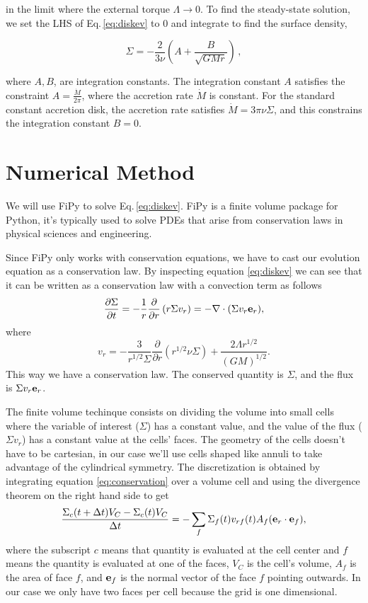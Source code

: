 \documentclass{article}
\begin{document}
in the limit where the external torque $\Lambda \rightarrow 0$. To find the steady-state solution, we set the LHS of Eq.\,\ref{eq:diskev} to 0 and integrate to find the surface density,

\begin{equation}
\Sigma = -\frac{2}{3 \nu} \left(A+  \frac{B}{\sqrt{G M r}}\right)\,,
\end{equation}

where $A, B$, are integration constants. The integration constant $A$ satisfies the constraint $A = \frac{\dot{M}}{2\pi}$, where the accretion rate $\dot{M}$ is constant. For the standard constant accretion disk, the accretion rate satisfies $\dot{M} = 3\pi \nu \Sigma$, and this constrains the integration constant $B = 0$.

\section{Numerical Method}

We will use FiPy to solve Eq.\,\ref{eq:diskev}. FiPy is a finite volume package for Python, it's typically used to
solve PDEs that arise from conservation laws in physical sciences and engineering.

Since FiPy only works with conservation equations, we have to cast our evolution equation as a conservation law.
By inspecting equation \ref{eq:diskev} we can see that it can be written as a conservation law with a convection 
term as follows
\begin{equation} \label{eq:conservation}
\frac{\partial \Sigma}{\partial t} = -\frac{1}{r} \frac{\partial}{\partial r} \left( r \Sigma v_{r}\right)=-\nabla\cdot (\Sigma v_r \bold{e}_{r}),
\end{equation}
where
\begin{equation} \label{eq:vr}
v_r = -\frac{3}{r^{1/2}\Sigma} \frac{\partial}{\partial r} \left(r^{1/2} \nu \Sigma\right) + \frac{2 \Lambda r^{1/2}}{(G M)^{1/2}}.
\end{equation}
This way we have a conservation law. The conserved quantity is $\Sigma$, and the flux is $\Sigma v_r \bold{e}_r$.

The finite volume techinque consists on dividing the volume into small cells where the variable of interest ($\Sigma$) has a constant value,
and the value of the flux ($\Sigma v_r$) has a constant value at the cells' faces. The geometry of the cells doesn't have to be cartesian, in
our case we'll use cells shaped like annuli to take advantage of the cylindrical symmetry.
The discretization is obtained by integrating equation \ref{eq:conservation} over a volume cell and using the divergence theorem on the
right hand side to get
\begin{equation} \label{eq:discretization}
\frac{\Sigma_c(t+\Delta t) V_C - \Sigma_c(t) V_C}{\Delta t} =
-\sum_{f} \Sigma_{f}(t) v_{rf}(t) A_{f} (\bold{e}_r \cdot \bold{e}_{f}),
\end{equation}
where the subscript $c$ means that quantity is evaluated at the cell center and $f$ means the quantity is evaluated at one of the faces,
$V_C$ is the cell's volume, $A_f$ is the area of face $f$, and $\bold{e}_{f}$ is the normal vector of the face $f$ pointing outwards.
In our case we only have two faces per cell because the grid is one 
dimensional.
\end{document}

